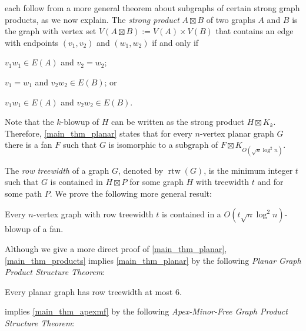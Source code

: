 \documentclass{patmorin}
\newcommand{\defin}[1]{\emph{\textcolor{brightmaroon}{#1}}}
\DeclareMathOperator{\rtw}{rtw}
\begin{document}
 each follow from a more general theorem about subgraphs of certain strong graph products, as we now explain.  The \defin{strong product} $A\boxtimes B$ of two graphs $A$ and $B$ is the graph with vertex set $V(A\boxtimes B):=V(A)\times V(B)$ that contains an edge with endpoints $(v_1,v_2)$  and $(w_1,w_2)$ if and only if
\begin{compactenum}
    \item $v_1w_1\in E(A)$ and $v_2=w_2$;
    \item $v_1=w_1$ and $v_2w_2\in E(B)$; or
    \item $v_1w_1\in E(A)$ and $v_2w_2\in E(B)$.
\end{compactenum}
Note that the $k$-blowup of $H$ can be written as the strong product $H\boxtimes K_k$.  Therefore, \cref{main_thm_planar} states that for every $n$-vertex planar graph $G$ there is a fan $F$ such that $G$ is isomorphic to a subgraph of $F\boxtimes K_{O(\sqrt{n}\log^2 n)}$.

The \defin{row treewidth} of a graph $G$, denoted by $\rtw(G)$, is the minimum integer $t$ such that $G$ is contained in $H\boxtimes P$ for some graph $H$ with treewidth $t$ and for some path $P$. We prove the following more general result:


\begin{thm}\label{main_thm_products}
  Every $n$-vertex graph with row treewidth $t$ is contained in a $O(t\sqrt{n}\log^2 n)$-blowup of a fan.
\end{thm}

Although we give a more direct proof of \cref{main_thm_planar}, \cref{main_thm_products} implies \cref{main_thm_planar} by the following \defin{Planar Graph Product Structure Theorem}:

\begin{thm}\label{planar_product_structure}
  Every planar graph has row treewidth at most $6$.
\end{thm}

 implies \cref{main_thm_apexmf} by the following \defin{Apex-Minor-Free Graph Product Structure Theorem}:
\end{document}
